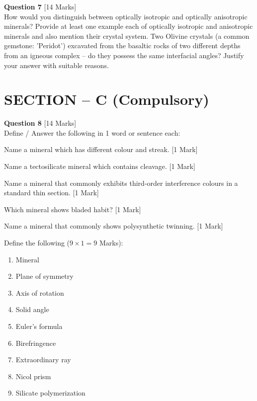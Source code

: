 \documentclass[11pt,a4paper]{article}
\begin{document}
\bigskip




\noindent   \textbf{Question 7} \hfill [14 Marks]\\
How would you distinguish between optically isotropic and optically anisotropic minerals? Provide at least one example each of optically isotropic and anisotropic minerals and also mention their crystal system. Two Olivine crystals (a common gemstone: 'Peridot') excavated from the basaltic rocks of two different depths from an igneous complex -- do they possess the same interfacial angles? Justify your answer with suitable reasons.

\bigskip
\section*{SECTION -- C (Compulsory)}




\noindent   \textbf{Question 8} \hfill [14 Marks]\\
Define / Answer the following in 1 word or sentence each:

\begin{parts}
  \item Name a mineral which has different colour and streak. \hfill [1 Mark]
  \item Name a tectosilicate mineral which contains cleavage. \hfill [1 Mark]
  \item Name a mineral that commonly exhibits third-order interference colours in a standard thin section. \hfill [1 Mark]
  \item Which mineral shows bladed habit? \hfill [1 Mark]
  \item Name a mineral that commonly shows polysynthetic twinning. \hfill [1 Mark]
  \item Define the following ($9  \times 1 = 9$ Marks):
  
\begin{enumerate}[label=(\roman*)]
    \item Mineral
    \item Plane of symmetry
    \item Axis of rotation
    \item Solid angle
    \item Euler's formula
    \item Birefringence
    \item Extraordinary ray
    \item Nicol prism
    \item Silicate polymerization
  \end{enumerate}
\end{parts}
\end{document}

